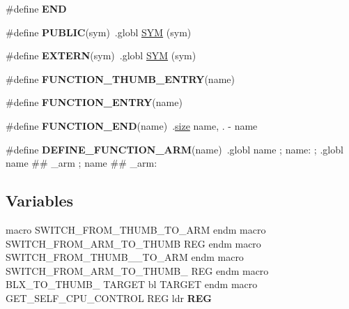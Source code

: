 \begin{DoxyCompactItemize}
\item 
\mbox{\label{group__RTEMSScoreCPUARMASM_ga29fd18bed01c4d836c7ebfe73a125c3f}} 
\#define {\bfseries E\+ND}
\item 
\mbox{\label{group__RTEMSScoreCPUARMASM_ga5e536c0e80cb78da6a74541281111e40}} 
\#define {\bfseries P\+U\+B\+L\+IC}(sym)~.globl \mbox{\hyperlink{group__RTEMSScoreCPUx86-64ASM_gafe05d428a5f345f51fb591debb815325}{S\+YM}} (sym)
\item 
\mbox{\label{group__RTEMSScoreCPUARMASM_ga9808b867f8d1bd54d78548a5cd5dc415}} 
\#define {\bfseries E\+X\+T\+E\+RN}(sym)~.globl \mbox{\hyperlink{group__RTEMSScoreCPUx86-64ASM_gafe05d428a5f345f51fb591debb815325}{S\+YM}} (sym)
\item 
\#define {\bfseries F\+U\+N\+C\+T\+I\+O\+N\+\_\+\+T\+H\+U\+M\+B\+\_\+\+E\+N\+T\+RY}(name)
\item 
\#define {\bfseries F\+U\+N\+C\+T\+I\+O\+N\+\_\+\+E\+N\+T\+RY}(name)
\item 
\mbox{\label{group__RTEMSScoreCPUARMASM_ga3636e709d1c6c289b9bad96f32d0243c}} 
\#define {\bfseries F\+U\+N\+C\+T\+I\+O\+N\+\_\+\+E\+ND}(name)~.\mbox{\hyperlink{sun4u_2tte_8h_a245260f6f74972558f61b85227df5aae}{size}} name, . -\/ name
\item 
\mbox{\label{group__RTEMSScoreCPUARMASM_ga26d46eef5e4dd49f410992cd5f2686d9}} 
\#define {\bfseries D\+E\+F\+I\+N\+E\+\_\+\+F\+U\+N\+C\+T\+I\+O\+N\+\_\+\+A\+RM}(name)~.globl name ; name\+: ; .globl name \#\# \+\_\+arm ; name \#\# \+\_\+arm\+:
\end{DoxyCompactItemize}
\subsection*{Variables}
\begin{DoxyCompactItemize}
\item 
\mbox{\label{group__RTEMSScoreCPUARMASM_gaed878175c7639846095344d1d2e17ae3}} 
macro S\+W\+I\+T\+C\+H\+\_\+\+F\+R\+O\+M\+\_\+\+T\+H\+U\+M\+B\+\_\+\+T\+O\+\_\+\+A\+RM endm macro S\+W\+I\+T\+C\+H\+\_\+\+F\+R\+O\+M\+\_\+\+A\+R\+M\+\_\+\+T\+O\+\_\+\+T\+H\+U\+MB R\+EG endm macro S\+W\+I\+T\+C\+H\+\_\+\+F\+R\+O\+M\+\_\+\+T\+H\+U\+M\+B\+\_\+\_\+\+T\+O\+\_\+\+A\+RM endm macro S\+W\+I\+T\+C\+H\+\_\+\+F\+R\+O\+M\+\_\+\+A\+R\+M\+\_\+\+T\+O\+\_\+\+T\+H\+U\+M\+B\+\_ R\+EG endm macro B\+L\+X\+\_\+\+T\+O\+\_\+\+T\+H\+U\+M\+B\+\_ T\+A\+R\+G\+ET bl T\+A\+R\+G\+ET endm macro G\+E\+T\+\_\+\+S\+E\+L\+F\+\_\+\+C\+P\+U\+\_\+\+C\+O\+N\+T\+R\+OL R\+EG ldr {\bfseries R\+EG}
\end{DoxyCompactItemize}


